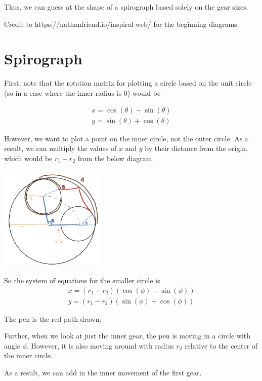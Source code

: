 \documentclass{article}
\theoremstyle{remark}
\theoremstyle{problem}
\numberwithin{problem}{subsection}
\numberwithin{Problem}{section}
\theoremstyle{definition}
\theoremstyle{definition}
\begin{document}
Thus, we can guess at the shape of a spirograph based solely on the gear sizes. 

Credit to https://nathanfriend.io/inspiral-web/ for the beginning diagrams. 

\section{Spirograph}

First, note that the rotation matrix for plotting a circle based on the unit circle (so in a case where the inner radius is $0$) would be 

\begin{align*}
    x = \cos(\theta) - \sin(\theta) \\
    y = \sin(\theta) + \cos(\theta)
\end{align*}

However, we want to plot a point on the inner circle, not the outer circle. As a result, we can multiply the values of $x$ and $y$ by their distance from the origin, which would be $r_1 - r_2$ from the below diagram. 

\begin{center}
\includegraphics[height=5cm]{images/Angle Diagram (1).png}
\end{center}

So the system of equations for the smaller circle is 
\begin{align*}
    x = (r_1 - r_2) \left( \cos(\phi) - \sin(\phi) \right)\\
    y = (r_1 - r_2) \left( \sin(\phi) + \cos(\phi) \right)
\end{align*}

The pen is the red path drawn. 

Further, when we look at just the inner gear, the pen is moving in a circle with angle $\phi.$ However, it is also moving around with radius $r_2$ relative to the center of the inner circle. 

As a result, we can add in the inner movement of the first gear. 
\end{document}
